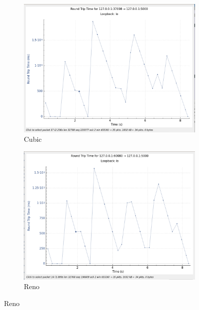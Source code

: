 \documentclass{report}
\begin{document}
\begin{figure}[H]
    \centering
    \begin{subfigure}[b]{0.45\textwidth}
        \centering
        \includegraphics[width=\textwidth]{Pics/Cubic/r1mbit_s1m_rtt}
        \caption{Cubic}
    \end{subfigure}
    \hfill
    \begin{subfigure}[b]{0.45\textwidth}
        \centering
        \includegraphics[width=\textwidth]{Pics/Reno/r1mbit_s1m_rtt}
        \caption{Reno}
    \end{subfigure}
    \medskip


\end{figure}
\end{document}
